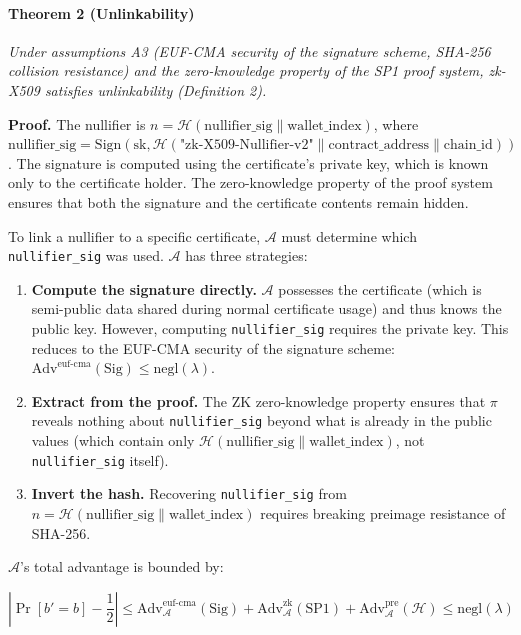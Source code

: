 \documentclass[11pt, a4paper]{article}
\begin{document}
\paragraph{Theorem 2 (Unlinkability)}\label{theorem-2-unlinkability}

\emph{Under assumptions A3 (EUF-CMA security of the signature scheme,
SHA-256 collision resistance) and the zero-knowledge property of the SP1
proof system, zk-X509 satisfies unlinkability (Definition 2).}

\textbf{Proof.} The nullifier is
\(n = \mathcal{H}(\text{nullifier\_sig} \| \text{wallet\_index})\),
where
\(\text{nullifier\_sig} = \text{Sign}(\text{sk}, \mathcal{H}(\text{"zk-X509-Nullifier-v2"} \| \text{contract\_address} \| \text{chain\_id}))\).
The signature is computed using the certificate's private key, which is
known only to the certificate holder. The zero-knowledge property of the
proof system ensures that both the signature and the certificate
contents remain hidden.

To link a nullifier to a specific certificate, \(\mathcal{A}\) must
determine which \texttt{nullifier\_sig} was used. \(\mathcal{A}\) has
three strategies:

\begin{enumerate}
\def\labelenumi{(\alph{enumi})}
\item
  \textbf{Compute the signature directly.} \(\mathcal{A}\) possesses the
  certificate (which is semi-public data shared during normal
  certificate usage) and thus knows the public key. However, computing
  \texttt{nullifier\_sig} requires the private key. This reduces to the
  EUF-CMA security of the signature scheme:
  \(\text{Adv}^{\text{euf-cma}}(\text{Sig}) \leq \text{negl}(\lambda)\).
\item
  \textbf{Extract from the proof.} The ZK zero-knowledge property
  ensures that \(\pi\) reveals nothing about \texttt{nullifier\_sig}
  beyond what is already in the public values (which contain only
  \(\mathcal{H}(\text{nullifier\_sig} \| \text{wallet\_index})\), not
  \texttt{nullifier\_sig} itself).
\item
  \textbf{Invert the hash.} Recovering \texttt{nullifier\_sig} from
  \(n = \mathcal{H}(\text{nullifier\_sig} \| \text{wallet\_index})\)
  requires breaking preimage resistance of SHA-256.
\end{enumerate}

\(\mathcal{A}\)'s total advantage is bounded by:

\[\left| \Pr[b' = b] - \frac{1}{2} \right| \leq \text{Adv}_{\mathcal{A}}^{\text{euf-cma}}(\text{Sig}) + \text{Adv}_{\mathcal{A}}^{\text{zk}}(\text{SP1}) + \text{Adv}_{\mathcal{A}}^{\text{pre}}(\mathcal{H}) \leq \text{negl}(\lambda)\]
\end{document}
